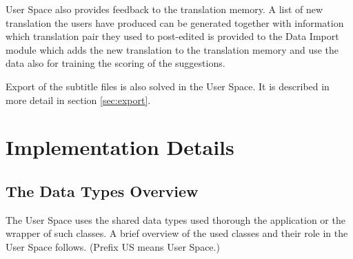 User Space also provides feedback to the translation memory. A list of new translation the users have produced can be generated together with information which translation pair they used to post-edited is provided to the Data Import module which adds the new translation to the translation memory and use the data also for training the scoring of the suggestions. 

Export of the subtitle files is also solved in the User Space. It is described in more detail in section \ref{sec:export}.

\section{Implementation Details}
\subsection{The Data Types Overview}

The User Space uses the shared data types used thorough the application or the wrapper of such classes. A brief overview of the used classes and their role in the User Space follows. (Prefix US means User Space.)

